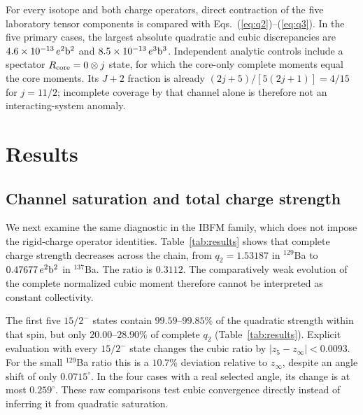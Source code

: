 \documentclass[pdflatex,iicol,sn-mathphys-num]{sn-jnl}
\begin{document}
For every isotope and both charge operators, direct contraction of the five laboratory tensor components is compared with Eqs.~(\ref{eq:q2})--(\ref{eq:q3}). In the five primary cases, the largest absolute quadratic and cubic discrepancies are $4.6\times10^{-13}\,e^2{\rm b}^2$ and $8.5\times10^{-13}\,e^3{\rm b}^3$. Independent analytic controls include a spectator $R_{\rm core}=0\otimes j$ state, for which the core-only complete moments equal the core moments. Its $J+2$ fraction is already $(2j+5)/[5(2j+1)]=4/15$ for $j=11/2$; incomplete coverage by that channel alone is therefore not an interacting-system anomaly.

\section{Results}\label{sec:results}



\subsection{Channel saturation and total charge strength}

We next examine the same diagnostic in the IBFM family, which does not impose the rigid-charge operator identities. Table~\ref{tab:results} shows that complete charge strength decreases across the chain, from $q_2=1.53187$ in $^{129}$Ba to $0.47677\,e^2{\rm b}^2$ in $^{137}$Ba. The ratio is $0.3112$. The comparatively weak evolution of the complete normalized cubic moment therefore cannot be interpreted as constant collectivity.



The first five $15/2^-$ states contain $99.59$--$99.85\%$ of the quadratic strength within that spin, but only $20.00$--$28.90\%$ of complete $q_2$ (Table~\ref{tab:results}). Explicit evaluation with every $15/2^-$ state changes the cubic ratio by $|z_5-z_\infty|<0.0093$. For the small $^{129}$Ba ratio this is a $10.7\%$ deviation relative to $z_\infty$, despite an angle shift of only $0.0715^\circ$. In the four cases with a real selected angle, its change is at most $0.259^\circ$. These raw comparisons test cubic convergence directly instead of inferring it from quadratic saturation.
\end{document}
